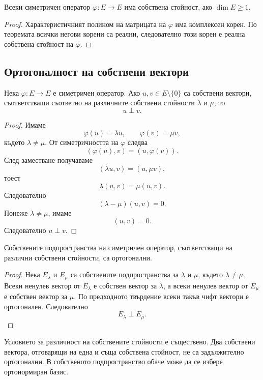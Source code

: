 \begin{cor}
Всеки симетричен оператор $\varphi:E\to E$ има собствена стойност, ако $\dim E\geq1$.
\end{cor}

\begin{proof}
Характеристичният полином на матрицата на $\varphi$ има комплексен корен. По теоремата всички негови корени са реални, следователно този корен е реална собствена стойност на $\varphi$.
\end{proof}

\subsection{Ортогоналност на собствени вектори}\label{s:30.3.2}

\begin{prop}
Нека $\varphi:E\to E$ е симетричен оператор. Ако $u,v\in E\setminus\{0\}$ са собствени вектори, съответстващи съответно на различните собствени стойности $\lambda$ и $\mu$, то
\[
u\perp v.
\]
\end{prop}

\begin{proof}
Имаме
\[
\varphi(u)=\lambda u,\qquad
\varphi(v)=\mu v,
\]
където $\lambda\ne\mu$. От симетричността на $\varphi$ следва
\[
(\varphi(u),v)=(u,\varphi(v)).
\]
След заместване получаваме
\[
(\lambda u,v)=(u,\mu v),
\]
тоест
\[
\lambda(u,v)=\mu(u,v).
\]
Следователно
\[
(\lambda-\mu)(u,v)=0.
\]
Понеже $\lambda\ne\mu$, имаме
\[
(u,v)=0.
\]
Следователно $u\perp v$.
\end{proof}

\begin{cor}
Собствените подпространства на симетричен оператор, съответстващи на различни собствени стойности, са ортогонални.
\end{cor}

\begin{proof}
Нека $E_\lambda$ и $E_\mu$ са собствените подпространства за $\lambda$ и $\mu$, където $\lambda\ne\mu$. Всеки ненулев вектор от $E_\lambda$ е собствен вектор за $\lambda$, а всеки ненулев вектор от $E_\mu$ е собствен вектор за $\mu$. По предходното твърдение всеки такъв чифт вектори е ортогонален. Следователно
\[
E_\lambda\perp E_\mu.
\]
\end{proof}

\begin{remark}
Условието за различност на собствените стойности е съществено. Два собствени вектора, отговарящи на една и съща собствена стойност, не са задължително ортогонални. В собственото подпространство обаче може да се избере ортонормиран базис.
\end{remark}

